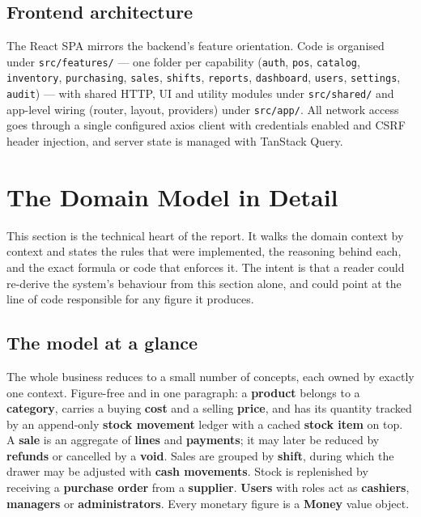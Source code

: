 \documentclass[11pt,a4paper]{article}
\begin{document}
\subsection{Frontend architecture}

The React SPA mirrors the backend's feature orientation. Code is organised under
\texttt{src/features/} --- one folder per capability (\texttt{auth}, \texttt{pos}, \texttt{catalog},
\texttt{inventory}, \texttt{purchasing}, \texttt{sales}, \texttt{shifts}, \texttt{reports},
\texttt{dashboard}, \texttt{users}, \texttt{settings}, \texttt{audit}) --- with shared HTTP, UI and utility modules under
\texttt{src/shared/} and app-level wiring (router, layout, providers) under \texttt{src/app/}. All
network access goes through a single configured axios client with credentials enabled and CSRF header
injection, and server state is managed with TanStack Query.

\section{The Domain Model in Detail}
\label{sec:domain}

This section is the technical heart of the report. It walks the domain context by context and states
the rules that were implemented, the reasoning behind each, and the exact formula or code that
enforces it. The intent is that a reader could re-derive the system's behaviour from this section
alone, and could point at the line of code responsible for any figure it produces.

\subsection{The model at a glance}

The whole business reduces to a small number of concepts, each owned by exactly one context. Figure-free
and in one paragraph: a \textbf{product} belongs to a \textbf{category}, carries a buying
\textbf{cost} and a selling \textbf{price}, and has its quantity tracked by an append-only
\textbf{stock movement} ledger with a cached \textbf{stock item} on top. A \textbf{sale} is an
aggregate of \textbf{lines} and \textbf{payments}; it may later be reduced by \textbf{refunds} or
cancelled by a \textbf{void}. Sales are grouped by \textbf{shift}, during which the drawer may be
adjusted with \textbf{cash movements}. Stock is replenished by receiving a \textbf{purchase order}
from a \textbf{supplier}. \textbf{Users} with roles act as \textbf{cashiers}, \textbf{managers} or
\textbf{administrators}. Every monetary figure is a \textbf{Money} value object.
\end{document}
